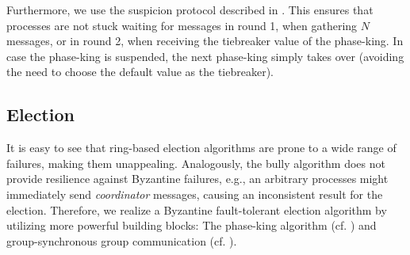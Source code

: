 \documentclass[runningheads]{llncs}
\begin{document}
Furthermore, we use the suspicion protocol described in . This ensures that processes are not stuck waiting for messages in round 1, when gathering $N$ messages, or in round 2, when receiving the tiebreaker value of the phase-king. In case the phase-king is suspended, the next phase-king simply takes over (avoiding the need to choose the default value as the tiebreaker).

\subsection{Election} \label{sec:election}
It is easy to see that ring-based election algorithms are prone to a wide range of failures, making them unappealing. Analogously, the bully algorithm \cite[p.~644-645]{ds_book} does not provide resilience against Byzantine failures, e.g., an arbitrary processes might immediately send \textit{coordinator} messages, causing an inconsistent result for the election. Therefore, we realize a Byzantine fault-tolerant election algorithm by utilizing more powerful building blocks: The phase-king algorithm (cf. ) and group-synchronous group communication (cf. ).
\end{document}
